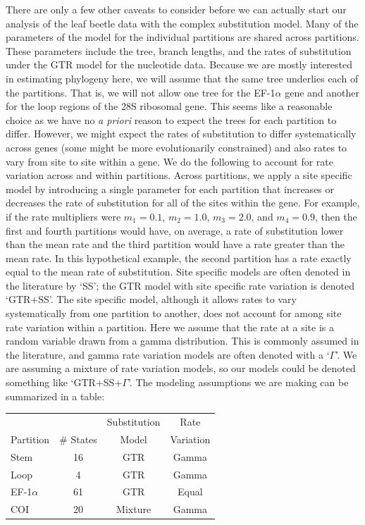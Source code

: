 \documentclass{svmult}
\begin{document}
There are only a few other caveats to consider before we can actually start our analysis of the
leaf beetle data with the complex substitution model. Many of the parameters of the model for the
individual partitions are shared across partitions. These parameters include the tree, branch
lengths, and the rates of substitution under the GTR model for the nucleotide data. Because we are
mostly interested in estimating phylogeny here, we will assume that the same tree underlies each of
the partitions. That is, we will not allow one tree for the EF-1$\alpha$ gene and another for the
loop regions of the 28S ribosomal gene. This seems like a reasonable choice as we have no {\it a
priori} reason to expect the trees for each partition to differ. However, we might expect the rates
of substitution to differ systematically across genes (some might be more evolutionarily
constrained) and also rates to vary from site to site within a gene. We do the following to account
for rate variation across and within partitions. Across partitions, we apply a site specific model
by introducing a single parameter for each partition that increases or decreases the rate of
substitution for all of the sites within the gene. For example, if the rate multipliers were $m_1 =
0.1$, $m_2 = 1.0$, $m_3 = 2.0$, and $m_4 = 0.9$, then the first and fourth partitions would have,
on average, a rate of substitution lower than the mean rate and the third partition would have a
rate greater than the mean rate. In this hypothetical example, the second partition has a rate
exactly equal to the mean rate of substitution. Site specific models are often denoted in the
literature by `SS'; the GTR model with site specific rate variation is denoted `GTR+SS'. The site
specific model, although it allows rates to vary systematically from one partition to another, does
not account for among site rate variation within a partition. Here we assume that the rate at a
site is a random variable drawn from a gamma distribution. This is commonly assumed in the
literature, and gamma rate variation models are often denoted with a `$\Gamma$'. We are assuming a
mixture of rate variation models, so our models could be denoted something like `GTR+SS+$\Gamma$'.
The modeling assumptions we are making can be summarized in a table:
\begin{center}
\begin{tabular}{lccc}
                &                  & Substitution & Rate \\
Partition & \# States & Model           & Variation \\ \hline
Stem & 16 & GTR & Gamma \\
Loop & 4 & GTR & Gamma \\
EF-1$\alpha$ & 61 & GTR & Equal \\
COI & 20 & Mixture & Gamma \\ 
\end{tabular}
\end{center}
\end{document}
